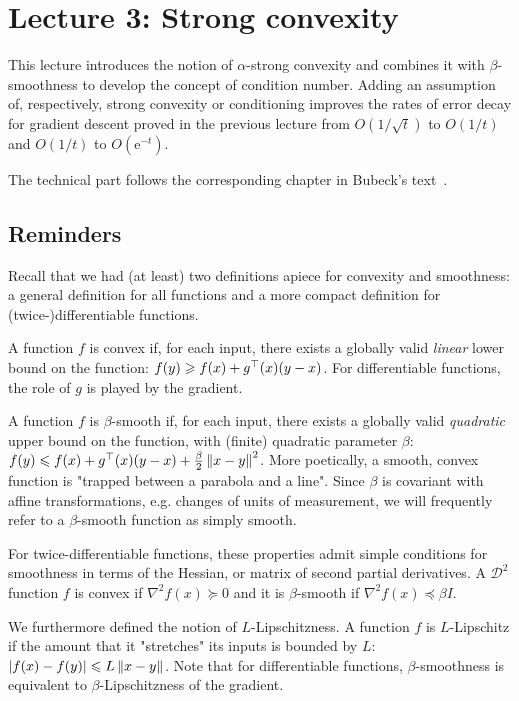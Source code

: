 \section{Lecture 3: Strong convexity}

This lecture introduces the notion of
$\alpha$-strong convexity
and combines it with
$\beta$-smoothness to develop the concept of
condition number.
Adding an assumption of, respectively,
strong convexity or conditioning
improves the rates of error decay
for gradient descent proved
in the previous lecture from
$O(1/\sqrt{t})$ to $O(1/t)$ and
$O(1/t)$ to $O(\mathrm{e}^{-t})$.

The technical part follows the corresponding chapter in Bubeck's
text~\cite{Bubeck}.

\subsection{Reminders}

Recall that we had (at least)
two definitions apiece for
convexity and smoothness:
a general definition for all functions
and a more compact definition for (twice-)differentiable functions.

A function $f$ is convex
if, for each input, there exists a
globally valid \emph{linear} lower bound on the function:
$f(y) \geqslant f(x) + g^\top(x)(y-x)$.
For differentiable functions,
the role of $g$ is played by the gradient.

A function $f$ is $\beta$-smooth
if, for each input, there exists a
globally valid \emph{quadratic} upper bound on the function,
with (finite) quadratic parameter $\beta$:
$f(y) \leqslant f(x) + g^\top(x)(y-x) + \frac{\beta}{2}\left\lVert x-y\right\rVert^2$.
More poetically,
a smooth, convex function is
"trapped between a parabola and a line".
Since $\beta$ is covariant with affine transformations,
e.g. changes of units of measurement,
we will frequently refer to a $\beta$-smooth function as simply
smooth.

For twice-differentiable functions,
these properties admit simple conditions
for smoothness in terms of the Hessian,
or matrix of second partial derivatives.
A $\mathcal{D}^2$ function $f$ is convex if
$\nabla^2f(x) \succeq 0$
and it is $\beta$-smooth if
$\nabla^2f(x) \preceq \beta I$.

We furthermore defined the notion of $L$-Lipschitzness.
A function $f$ is $L$-Lipschitz if the amount that it
"stretches" its inputs is bounded by $L$:
$\left\lvert f(x)-f(y)\right\rvert \leqslant L\left\lVert x-y\right\rVert$.
Note that for differentiable functions,
$\beta$-smoothness is equivalent to
$\beta$-Lipschitzness of the gradient.

